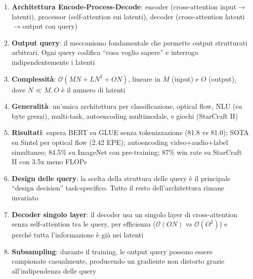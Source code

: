 \documentclass[12pt,a4paper]{article}
\begin{document}
\begin{formulabox}
\begin{enumerate}
    \item \textbf{Architettura Encode-Process-Decode}: encoder (cross-attention input$\to$latenti), processor (self-attention sui latenti), decoder (cross-attention latenti$\to$output con query)

    \item \textbf{Output query}: il meccanismo fondamentale che permette output strutturati arbitrari. Ogni query codifica ``cosa voglio sapere'' e interroga indipendentemente i latenti

    \item \textbf{Complessit\`a}: $\mathcal{O}(MN + LN^2 + ON)$, lineare in $M$ (input) e $O$ (output), dove $N \ll M, O$ \`e il numero di latenti

    \item \textbf{Generalit\`a}: un'unica architettura per classificazione, optical flow, NLU (su byte grezzi), multi-task, autoencoding multimodale, e giochi (StarCraft II)

    \item \textbf{Risultati}: supera BERT su GLUE senza tokenizzazione (81.8 vs 81.0); SOTA su Sintel per optical flow (2.42 EPE); autoencoding video+audio+label simultaneo; 84.5\% su ImageNet con pre-training; 87\% win rate su StarCraft II con 3.5x meno FLOPs

    \item \textbf{Design delle query}: la scelta della struttura delle query \`e il principale ``design decision'' task-specifico. Tutto il resto dell'architettura rimane invariato

    \item \textbf{Decoder singolo layer}: il decoder usa un singolo layer di cross-attention senza self-attention tra le query, per efficienza ($\mathcal{O}(ON)$ vs $\mathcal{O}(O^2)$) e perch\'e tutta l'informazione \`e gi\`a nei latenti

    \item \textbf{Subsampling}: durante il training, le output query possono essere campionate casualmente, producendo un gradiente non distorto grazie all'indipendenza delle query
\end{enumerate}
\end{formulabox}
\end{document}
